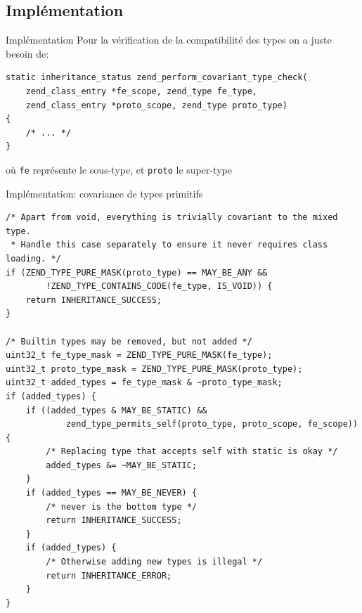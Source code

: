 \documentclass[10pt]{beamer}
\begin{document}
\subsection{Implémentation}
\begin{frame}[fragile]{Implémentation}
    Pour la vérification de la compatibilité des types on a juste besoin de:
    \begin{verbatim}
static inheritance_status zend_perform_covariant_type_check(
    zend_class_entry *fe_scope, zend_type fe_type,
    zend_class_entry *proto_scope, zend_type proto_type)
{
    /* ... */
}
    \end{verbatim}
    où \texttt{fe} représente le sous-type, et \texttt{proto} le super-type
\end{frame}
\begin{frame}[fragile]{Implémentation: covariance de types primitifs}
    \begin{verbatim}
/* Apart from void, everything is trivially covariant to the mixed type.
 * Handle this case separately to ensure it never requires class loading. */
if (ZEND_TYPE_PURE_MASK(proto_type) == MAY_BE_ANY &&
        !ZEND_TYPE_CONTAINS_CODE(fe_type, IS_VOID)) {
    return INHERITANCE_SUCCESS;
}

/* Builtin types may be removed, but not added */
uint32_t fe_type_mask = ZEND_TYPE_PURE_MASK(fe_type);
uint32_t proto_type_mask = ZEND_TYPE_PURE_MASK(proto_type);
uint32_t added_types = fe_type_mask & ~proto_type_mask;
if (added_types) {
    if ((added_types & MAY_BE_STATIC) &&
            zend_type_permits_self(proto_type, proto_scope, fe_scope)) {
        /* Replacing type that accepts self with static is okay */
        added_types &= ~MAY_BE_STATIC;
    }
    if (added_types == MAY_BE_NEVER) {
        /* never is the bottom type */
        return INHERITANCE_SUCCESS;
    }
    if (added_types) {
        /* Otherwise adding new types is illegal */
        return INHERITANCE_ERROR;
    }
}
    \end{verbatim}
\end{frame}
\end{document}
